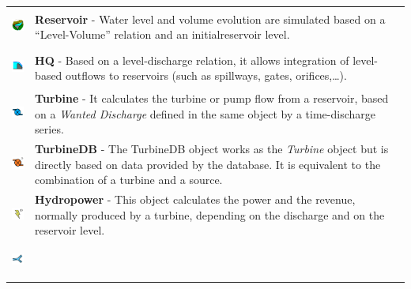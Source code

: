 \documentclass[
  letterpaper,
  DIV=11,
  numbers=noendperiod]{scrreprt}
\begin{document}
\begin{longtable}[]{@{}
  >{\raggedright\arraybackslash}p{}
  >{\raggedright\arraybackslash}p{}@{}}
\toprule()
\endhead
\includegraphics[width=0.44in,height=0.44in]{./figures/fig-icon_object_reservoir.png}
& \textbf{Reservoir} - Water level and volume evolution are simulated
based on a ``Level-Volume'' relation and an initialreservoir level. \\
\includegraphics[width=0.44in,height=0.44in]{./figures/fig-icon_object_hq.png}
& \textbf{HQ} - Based on a level-discharge relation, it allows
integration of level-based outflows to reservoirs (such as spillways,
gates, orifices,\ldots). \\
\includegraphics[width=0.44in,height=0.44in]{./figures/fig-icon_object_turbine.png}
& \textbf{Turbine} - It calculates the turbine or pump flow from a
reservoir, based on a \emph{Wanted Discharge} defined in the same object
by a time-discharge series. \\
\includegraphics[width=0.44in,height=0.44in]{./figures/fig-icon_object_turbinedb.png}
& \textbf{TurbineDB} - The TurbineDB object works as the \emph{Turbine}
object but is directly based on data provided by the database. It is
equivalent to the combination of a turbine and a source. \\
\includegraphics[width=0.44in,height=0.44in]{./figures/fig-icon_object_hydropower.png}
& \textbf{Hydropower} - This object calculates the power and the
revenue, normally produced by a turbine, depending on the discharge and
on the reservoir level. \\
\includegraphics[width=0.44in,height=0.44in]{./figures/fig-icon_object_diversion.png}

\end{longtable}
\end{document}
